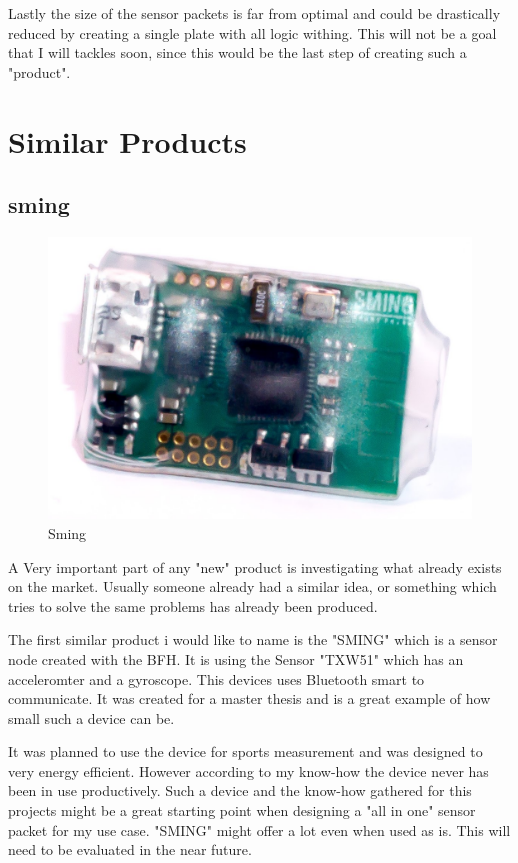 Lastly the size of the sensor packets is far from optimal and could be drastically reduced by creating a single plate with all logic withing. This will not be a goal that I will tackles soon, since this would be the last step of creating such a "product".

\section{Similar Products}

\subsection{sming}

\begin{figure}
  \begin{center}
\includegraphics[width=\linewidth]{images/sming_pic2.jpg}
  \end{center}
  \caption{\label{fig:Sming}Sming}
\end{figure}
A Very important part of any "new" product is investigating what already exists on the market.
Usually someone already had a similar idea, or something which tries to solve the same problems has already been produced. 

The first similar product i would like to name is the "SMING" which is a sensor node created with the BFH. 
It is using the Sensor "TXW51" which has an acceleromter and a gyroscope. This devices uses Bluetooth smart to communicate. It was created for a master thesis and is a great example of how small such a device can be. 

It was planned to use the device for sports measurement and was designed to very energy efficient. However according to my know-how the device never has been in use productively. \cite{sming:book}
Such a device and the know-how gathered for this projects might be a great starting point when designing a "all in one" sensor packet for my use case. "SMING" might offer a lot even when used as is. This will need to be evaluated in the near future.


